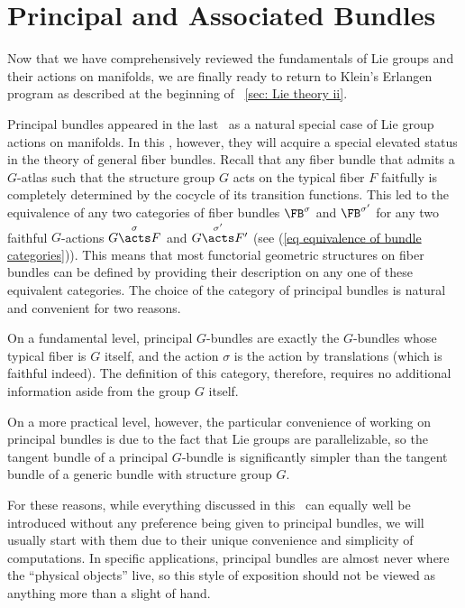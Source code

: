 \section{Principal and Associated Bundles}

    Now that we have comprehensively reviewed the fundamentals of Lie groups and their actions on manifolds, we are finally ready to return to Klein's Erlangen program as described at the beginning of \Sect~\ref{sec: Lie theory ii}.

    Principal bundles appeared in the last \sect\ as a natural special case of Lie group actions on manifolds. In this \sect, however, they will acquire a special elevated status in the theory of general fiber bundles. Recall that any fiber bundle that admits a $G$-atlas such that the structure group $G$ acts on the typical fiber $F$ faitfully is completely determined by the cocycle of its transition functions. This led to the equivalence of any two categories of fiber bundles $\FB^\sigma$ and $\FB^{\sigma'}$ for any two faithful $G$-actions $G\overset{\sigma}{\acts}F$ and $G\overset{\sigma'}{\acts}F'$ (see (\ref{eq equivalence of bundle categories})). This means that most functorial geometric structures on fiber bundles can be defined by providing their description on any one of these equivalent categories. The choice of the category of principal bundles is natural and convenient for two reasons. 
    
    On a fundamental level, principal $G$-bundles are exactly the $G$-bundles whose typical fiber is $G$ itself, and the action $\sigma$ is the action by translations (which is faithful indeed). The definition of this category, therefore, requires no additional information aside from the group $G$ itself. 
    
    On a more practical level, however, the particular convenience of working on principal bundles is due to the fact that Lie groups are parallelizable, so the tangent bundle of a principal $G$-bundle is significantly simpler than the tangent bundle of a generic bundle with structure group $G$. 

    For these reasons, while everything discussed in this \sect\ can equally well be introduced without any preference being given to principal bundles, we will usually start with them due to their unique convenience and simplicity of computations. In specific applications, principal bundles are almost never where the ``physical objects'' live, so this style of exposition should not be viewed as anything more than a slight of hand.



